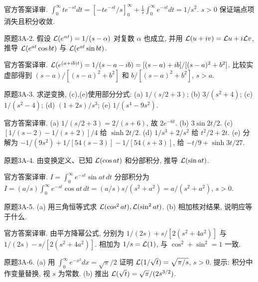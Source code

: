 \begin{solution}
官方答案译审. $\int_0^\infty te^{-st}dt=[-te^{-st}/s]_0^\infty+\frac1s\int_0^\infty e^{-st}dt=1/s^2$. $s>0$ 保证端点项消失且积分收敛.
\end{solution}
\begin{exercise}\label{cw:bank-3A-2}
原题3A-2. 假设 $\mathcal L(e^{\alpha t})=1/(s-\alpha)$ 对复数 $\alpha$ 也成立, 并用 $\mathcal L(u+iv)=\mathcal L u+i\mathcal L v$, 推导 $\mathcal L(e^{at}\cos bt)$ 与 $\mathcal L(e^{at}\sin bt)$.
\end{exercise}
\begin{solution}
官方答案译审. $\mathcal L(e^{(a+ib)t})=1/(s-a-ib)=[(s-a)+ib]/[(s-a)^2+b^2]$. 比较实虚部得到 $(s-a)/[(s-a)^2+b^2]$ 和 $b/[(s-a)^2+b^2]$, $s>a$.
\end{solution}
\begin{exercise}\label{cw:bank-3A-3}
原题3A-3. 求逆变换, (c),(e)使用部分分式: (a) $1/(s/2+3)$; (b) $3/(s^2+4)$; (c) $1/(s^2-4)$; (d) $(1+2s)/s^3$; (e) $1/(s^4-9s^2)$.
\end{exercise}
\begin{solution}
官方答案译审. (a) $1/(s/2+3)=2/(s+6)$, 故 $2e^{-6t}$. (b) $3\sin2t/2$. (c) $[1/(s-2)-1/(s+2)]/4$ 给 $\sinh2t/2$. (d) $1/s^3+2/s^2$ 给 $t^2/2+2t$. (e) 分解为 $-1/(9s^2)+1/[54(s-3)]-1/[54(s+3)]$, 给 $-t/9+\sinh3t/27$.
\end{solution}
\begin{exercise}\label{cw:bank-3A-4}
原题3A-4. 由变换定义、已知 $\mathcal L(\cos at)$ 和分部积分, 推导 $\mathcal L(\sin at)$.
\end{exercise}
\begin{solution}
官方答案译审. $I=\int_0^\infty e^{-st}\sin at\,dt$ 分部积分为 $I=(a/s)\int_0^\infty e^{-st}\cos at\,dt=(a/s)s/(s^2+a^2)=a/(s^2+a^2)$, $s>0$.
\end{solution}
\begin{exercise}\label{cw:bank-3A-5}
原题3A-5. (a) 用三角恒等式求 $\mathcal L(\cos^2at),\mathcal L(\sin^2at)$. (b) 相加核对结果, 说明应等于什么.
\end{exercise}
\begin{solution}
官方答案译审. 由平方降幂公式, 分别为 $1/(2s)+s/[2(s^2+4a^2)]$ 与 $1/(2s)-s/[2(s^2+4a^2)]$. 相加为 $1/s=\mathcal L(1)$, 与 $\cos^2+\sin^2=1$ 一致.
\end{solution}
\begin{exercise}\label{cw:bank-3A-6}
原题3A-6. (a) 用 $\int_0^\infty e^{-x^2}dx=\sqrt\pi/2$ 证明 $\mathcal L(1/\sqrt t)=\sqrt{\pi/s}$, $s>0$. 提示: 积分中作变量替换, 视 $s$ 为常数. (b) 推出 $\mathcal L(\sqrt t)=\sqrt\pi/(2s^{3/2})$.
\end{exercise}
